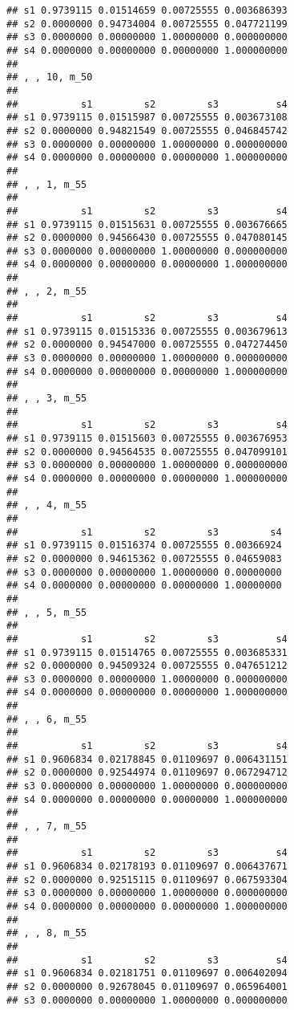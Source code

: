 \documentclass[
]{article}
\begin{document}
\begin{verbatim}
## s1 0.9739115 0.01514659 0.00725555 0.003686393
## s2 0.0000000 0.94734004 0.00725555 0.047721199
## s3 0.0000000 0.00000000 1.00000000 0.000000000
## s4 0.0000000 0.00000000 0.00000000 1.000000000
## 
## , , 10, m_50
## 
##           s1         s2         s3          s4
## s1 0.9739115 0.01515987 0.00725555 0.003673108
## s2 0.0000000 0.94821549 0.00725555 0.046845742
## s3 0.0000000 0.00000000 1.00000000 0.000000000
## s4 0.0000000 0.00000000 0.00000000 1.000000000
## 
## , , 1, m_55
## 
##           s1         s2         s3          s4
## s1 0.9739115 0.01515631 0.00725555 0.003676665
## s2 0.0000000 0.94566430 0.00725555 0.047080145
## s3 0.0000000 0.00000000 1.00000000 0.000000000
## s4 0.0000000 0.00000000 0.00000000 1.000000000
## 
## , , 2, m_55
## 
##           s1         s2         s3          s4
## s1 0.9739115 0.01515336 0.00725555 0.003679613
## s2 0.0000000 0.94547000 0.00725555 0.047274450
## s3 0.0000000 0.00000000 1.00000000 0.000000000
## s4 0.0000000 0.00000000 0.00000000 1.000000000
## 
## , , 3, m_55
## 
##           s1         s2         s3          s4
## s1 0.9739115 0.01515603 0.00725555 0.003676953
## s2 0.0000000 0.94564535 0.00725555 0.047099101
## s3 0.0000000 0.00000000 1.00000000 0.000000000
## s4 0.0000000 0.00000000 0.00000000 1.000000000
## 
## , , 4, m_55
## 
##           s1         s2         s3         s4
## s1 0.9739115 0.01516374 0.00725555 0.00366924
## s2 0.0000000 0.94615362 0.00725555 0.04659083
## s3 0.0000000 0.00000000 1.00000000 0.00000000
## s4 0.0000000 0.00000000 0.00000000 1.00000000
## 
## , , 5, m_55
## 
##           s1         s2         s3          s4
## s1 0.9739115 0.01514765 0.00725555 0.003685331
## s2 0.0000000 0.94509324 0.00725555 0.047651212
## s3 0.0000000 0.00000000 1.00000000 0.000000000
## s4 0.0000000 0.00000000 0.00000000 1.000000000
## 
## , , 6, m_55
## 
##           s1         s2         s3          s4
## s1 0.9606834 0.02178845 0.01109697 0.006431151
## s2 0.0000000 0.92544974 0.01109697 0.067294712
## s3 0.0000000 0.00000000 1.00000000 0.000000000
## s4 0.0000000 0.00000000 0.00000000 1.000000000
## 
## , , 7, m_55
## 
##           s1         s2         s3          s4
## s1 0.9606834 0.02178193 0.01109697 0.006437671
## s2 0.0000000 0.92515115 0.01109697 0.067593304
## s3 0.0000000 0.00000000 1.00000000 0.000000000
## s4 0.0000000 0.00000000 0.00000000 1.000000000
## 
## , , 8, m_55
## 
##           s1         s2         s3          s4
## s1 0.9606834 0.02181751 0.01109697 0.006402094
## s2 0.0000000 0.92678045 0.01109697 0.065964001
## s3 0.0000000 0.00000000 1.00000000 0.000000000

\end{verbatim}
\end{document}
